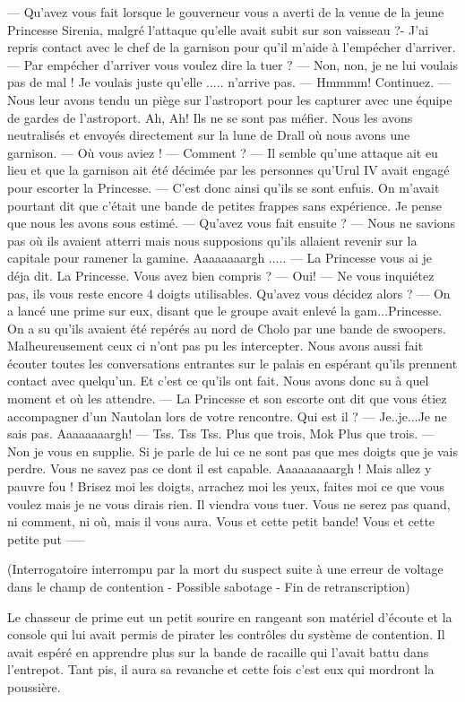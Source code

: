 \documentclass[a4paper,10pt,twoside,twocolumn,openany]{book}
\begin{document}
\begin{quotebox}
\begin{dialogue}
--- Qu'avez vous fait lorsque le gouverneur vous a averti de la venue de la jeune Princesse Sirenia, malgré l'attaque qu'elle avait subit sur son vaisseau ?- J'ai repris contact avec le chef de la garnison pour qu'il m'aide à l'empécher d'arriver.
--- Par empécher d'arriver vous voulez dire la tuer ?
--- Non, non, je ne lui voulais pas de mal ! Je voulais juste qu'elle ..... n'arrive pas.
--- Hmmmm! Continuez.
--- Nous leur avons tendu un piège sur l'astroport pour les capturer avec une équipe de gardes de l'astroport. Ah, Ah! Ils ne se sont pas méfier. Nous les avons neutralisés et envoyés directement sur la lune de Drall où nous avons une garnison.
--- Où vous aviez !
--- Comment ?
--- Il semble qu'une attaque ait eu lieu et que la garnison ait été décimée par les personnes qu'Urul IV avait engagé pour escorter la Princesse.
--- C'est donc ainsi qu'ils se sont enfuis. On m'avait pourtant dit que c'était une bande de petites frappes sans expérience. Je pense que nous les avons sous estimé.
--- Qu'avez vous fait ensuite ?
--- Nous ne savions pas où ils avaient atterri mais nous supposions qu'ils allaient revenir sur la capitale pour ramener la gamine. Aaaaaaaargh .....
--- La Princesse vous ai je déja dit. La Princesse. Vous avez bien compris ?
--- Oui!
--- Ne vous inquiétez pas, ils vous reste encore 4 doigts utilisables. Qu'avez vous décidez alors ?
--- On a lancé une prime sur eux, disant que le groupe avait enlevé la gam...Princesse. On a su qu'ils avaient été repérés au nord de Cholo par une bande de swoopers. Malheureusement ceux ci n'ont pas pu les intercepter. Nous avons aussi fait écouter toutes les conversations entrantes sur le palais en espérant qu'ils prennent contact avec quelqu'un. Et c'est ce qu'ils ont fait. Nous avons donc su à quel moment et où les attendre.
--- La Princesse et son escorte ont dit que vous étiez accompagner d'un Nautolan lors de votre rencontre. Qui est il ?
--- Je..je...Je ne sais pas. Aaaaaaaargh!
--- Tss. Tss Tss. Plus que trois, Mok Plus que trois.
--- Non je vous en supplie. Si je parle de lui ce ne sont pas que mes doigts que je vais perdre. Vous ne savez pas ce dont il est capable. Aaaaaaaaargh ! Mais allez y pauvre fou ! Brisez moi les doigts, arrachez moi les yeux, faites moi ce que vous voulez mais je ne vous dirais rien. Il viendra vous tuer. Vous ne serez pas quand, ni comment, ni où, mais il vous aura. Vous et cette petit bande! Vous et cette petite put -----
\end{dialogue}

(Interrogatoire interrompu par la mort du suspect suite à une erreur de voltage dans le champ de
contention - Possible sabotage - Fin de retranscription)

Le chasseur de prime eut un petit sourire en rangeant son matériel d'écoute et la console qui lui avait
permis de pirater les contrôles du système de contention. Il avait espéré en apprendre plus sur la bande
de racaille qui l'avait battu dans l'entrepot. Tant pis, il aura sa revanche et cette fois c'est eux qui
mordront la poussière.
\end{quotebox}

\clearevenpage
\cleardoublepage
\end{document}
